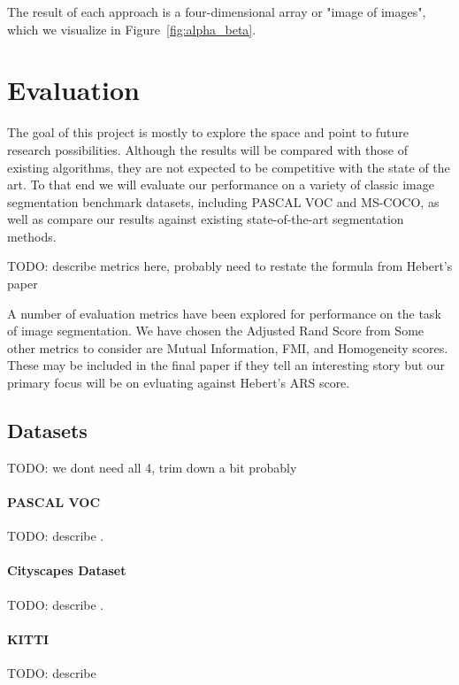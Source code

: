 \documentclass[twocolumn]{article}
\newcommand{\todo}[1]{}
\renewcommand{\todo}[1]{{\color{red} TODO: {#1}}}
\newcommand{\seclab}[1]{\label{sec:#1}}
\newcommand{\figref}[1]{Figure~\ref{fig:#1}}
\begin{document}
The result of each approach is a four-dimensional array or "image of
images", which we visualize in \figref{alpha_beta}.

\section{Evaluation}\seclab{eval}

The goal of this project is mostly to explore the space and point to future
research possibilities. Although the results will be compared with those of
existing algorithms, they are not expected to be competitive with the state of
the art. To that end we will evaluate our performance on a variety of classic
image segmentation benchmark datasets, including PASCAL VOC and MS-COCO, as well
as compare our results against existing state-of-the-art segmentation methods. 

\todo{describe metrics here, probably need to restate the formula from Hebert's paper}

A number of evaluation metrics have been explored for performance on the task of
image segmentation. We have chosen the Adjusted Rand Score from
\cite{unnikrishnan2005measure}  Some other metrics to consider are Mutual
Information, FMI, and Homogeneity scores. These may be included in the final
paper if they tell an interesting story but our primary focus will be on
evluating against Hebert's ARS score.

\subsection{Datasets}\seclab{data}

\todo{we dont need all 4, trim down a bit probably}

\paragraph{PASCAL VOC} \todo{describe} \cite{Everingham10}.

\paragraph{Cityscapes Dataset} \todo{describe} \cite{cordts2016cityscapes}.

\paragraph{KITTI} \todo{describe} \cite{geiger2012we}
\end{document}
